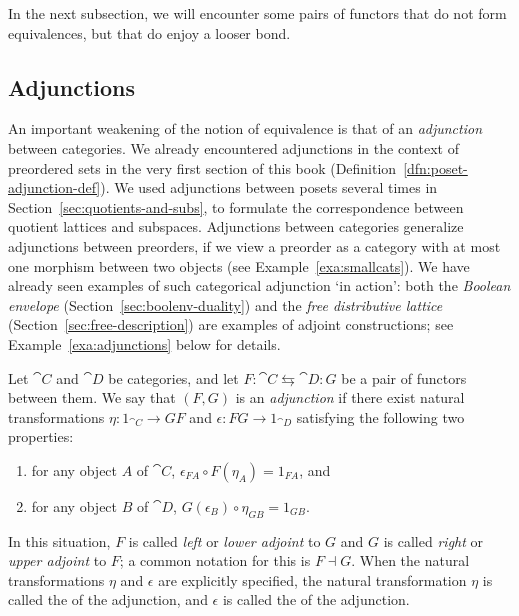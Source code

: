 In the next subsection, we will encounter some pairs of functors that do not form equivalences, but that do enjoy a looser bond.










\subsection*{Adjunctions}
An important weakening of the notion of equivalence is that of an \emph{adjunction} between categories. We already encountered adjunctions in the context of preordered sets in the very first section of this book (Definition~\ref{dfn:poset-adjunction-def}). We used adjunctions between posets several times in Section~\ref{sec:quotients-and-subs}, to formulate the correspondence between quotient lattices and subspaces. Adjunctions between categories generalize adjunctions between preorders, if we view a preorder as a category with at most one morphism between two objects (see Example~\ref{exa:smallcats}). We have already seen examples of such categorical adjunction `in action': both the \emph{Boolean envelope} (Section~\ref{sec:boolenv-duality}) and the \emph{free distributive lattice} (Section~\ref{sec:free-description}) are examples of adjoint constructions; see Example~\ref{exa:adjunctions} below for details. 

\begin{definition}\label{dfn:adjunction}
  Let $\cat{C}$ and $\cat{D}$ be categories, and let $F \colon \cat{C} \leftrightarrows \cat{D} \colon G$ be a pair of functors between them. We say that $(F, G)$ is an \emph{adjunction} if there exist natural transformations $\eta \colon 1_{\cat{C}} \to GF$ and $\epsilon \colon FG \to 1_{\cat{D}}$ satisfying the following two properties:
  \begin{enumerate}
  \item\label{itm:triangle-F} for any object $A$ of $\cat{C}$, $\epsilon_{FA} \circ F(\eta_A) = 1_{FA}$, and
  \item\label{itm:triangle-G} for any object $B$ of $\cat{D}$, $G(\epsilon_B) \circ \eta_{GB} = 1_{GB}$.
  \end{enumerate}
  In this situation, $F$ is called \emph{left} or \emph{lower adjoint} to $G$ and $G$ is called \emph{right} or \emph{upper adjoint} to $F$; a common notation for this is $F \dashv G$.  When the natural transformations $\eta$ and $\epsilon$ are explicitly specified, the natural transformation $\eta$ is called the  of the adjunction, and $\epsilon$ is called the  of the adjunction.
\end{definition}

